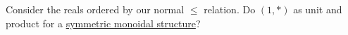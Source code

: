 Consider the reals ordered by our normal $\leq$ relation. Do $(1,*)$ as unit and product for a \hyperref[D2.2]{symmetric monoidal structure}?